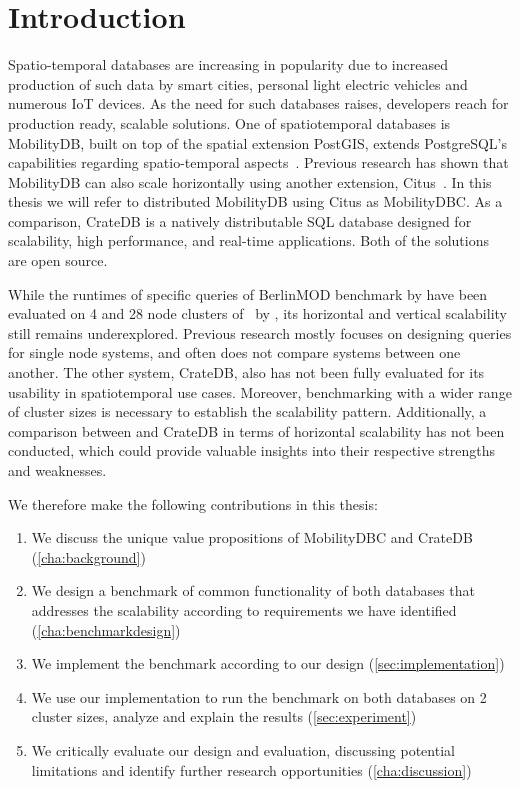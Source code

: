 \section{Introduction}
\label{cha:introduction}

Spatio-temporal databases are increasing in popularity due to increased production of such data by smart cities, personal light electric vehicles and numerous IoT devices.
As the need for such databases raises, developers reach for production ready, scalable solutions.
One of spatiotemporal databases is MobilityDB, built on top of the spatial extension PostGIS, extends PostgreSQL's capabilities regarding spatio-temporal aspects~\parencite{zimanyiMobilityDBMobilityDatabase2020}.
Previous research has shown that MobilityDB can also scale horizontally using another extension, Citus~\parencite{bakliDistributedMobilityData2020, bakliDistributedMovingObject2019, cubukcuCitusDistributedPostgreSQL2021}.
In this thesis we will refer to distributed MobilityDB using Citus as MobilityDBC.
As a comparison, CrateDB is a natively distributable SQL database designed for scalability, high performance, and real-time applications.
Both of the solutions are open source.

While the runtimes of specific queries of BerlinMOD benchmark by \textcite{duntgenBerlinMODBenchmarkMoving2009} have been evaluated on 4 and 28 node clusters of \mobilitydbc~by \parencite{bakliDistributedMobilityData2020}, its horizontal and vertical scalability still remains underexplored.
Previous research mostly focuses on designing queries for single node systems, and often does not compare systems between one another.
The other system, CrateDB, also has not been fully evaluated for its usability in spatiotemporal use cases.
Moreover, benchmarking with a wider range of cluster sizes is necessary to establish the scalability pattern.
Additionally, a comparison between \mobilitydbc and CrateDB in terms of horizontal scalability has not been conducted, which could provide valuable insights into their respective strengths and weaknesses.

We therefore make the following contributions in this thesis:
\begin{enumerate}
  \item We discuss the unique value propositions of MobilityDBC and CrateDB (\cref{cha:background})
  \item We design a benchmark of common functionality of both databases that addresses the scalability according to requirements we have identified (\cref{cha:benchmarkdesign})
  \item We implement the benchmark according to our design (\cref{sec:implementation})
  \item We use our implementation to run the benchmark on both databases on 2 cluster sizes, analyze and explain the results (\cref{sec:experiment})
  \item We critically evaluate our design and evaluation, discussing potential limitations and identify further research opportunities (\cref{cha:discussion})
\end{enumerate}
